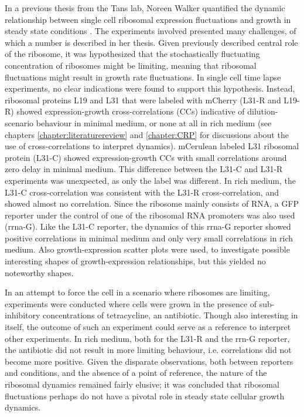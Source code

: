 In a previous thesis from the Tans lab, Noreen Walker 
quantified the dynamic relationship between single cell ribosomal expression fluctuations and growth in steady state conditions \cite{Walker2016t}.
%
The experiments involved presented many challenges, 
of which a number is described in her thesis.
%
%
Given previously described central role of the ribosome, 
it was hypothesized that the stochastically fluctuating concentration of ribosomes might be limiting, 
meaning that ribosomal fluctuations might result in growth rate fluctuations.
%
In single cell time lapse experiments, no clear indications were found to support this hypothesis.
%
Instead, 
ribosomal proteins L19 and L31 that were labeled with mCherry (L31-R and L19-R)
showed expression-growth cross-correlations (CCs) indicative of dilution-scenario behaviour in minimal medium, or none at all in rich medium (see chapters \ref{chapter:literaturereview} and \ref{chapter:CRP} for discussions about the use of cross-correlations to interpret dynamics). 
mCerulean labeled L31 ribosomal protein (L31-C) showed expression-growth CCs with small correlations around zero delay 
in minimal medium.
This difference between the L31-C and L31-R experiments was unexpected, as only the label was different.
%
In rich medium, the L31-C cross-correlation was consistent with the L31-R cross-correlation, and showed almost no correlation.
%
Since the ribosome mainly consists of RNA, 
a GFP reporter under the control of one of the ribosomal RNA promoters was also used (rrna-G).
Like the L31-C reporter, the dynamics of this rrna-G reporter showed positive correlations in minimal medium and only very small correlations in rich medium.
%
Also growth-expression scatter plots were used, to investigate possible interesting shapes of growth-expression relationships, but this yielded no noteworthy shapes.

In an attempt to force the cell in a scenario where ribosomes are limiting, experiments were conducted where cells were grown in the presence of sub-inhibitory concentrations of tetracycline, an antibiotic.
%
Though also interesting in itself, the outcome of such an experiment could serve as a reference to interpret other experiments.
%
In rich medium, both for the L31-R and the rrn-G reporter, the antibiotic did not result in more limiting behaviour, i.e. correlations did not become more positive.
%
Given the disparate observations, both between reporters and conditions, 
and the absence of a point of reference,
the nature of the ribosomal dynamics remained fairly elusive; it was concluded that ribosomal fluctuations perhaps do not have a pivotal role in steady state cellular growth dynamics.

